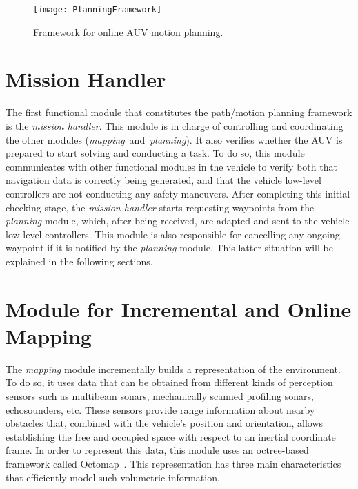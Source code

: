 \begin{figure}[htbp]
	\centering
	\texttt{[image: PlanningFramework]} \quad
\caption[Framework for online AUV motion planning.]
{Framework for online AUV motion planning.}
\label{fig:ModulesPlannFramework}
\end{figure}

\section{Mission Handler}

The first functional module that constitutes the path/motion planning framework
is the \textit{mission handler}. This module is in charge of controlling and
coordinating the other modules \mbox{(\textit{mapping} and \textit{planning})}.
It also verifies whether the \ac{AUV} is prepared to start solving and
conducting a task. To do so, this module communicates with other functional
modules in the vehicle to verify both that navigation data is correctly being
generated, and that the vehicle low-level controllers are not conducting any
safety maneuvers. After completing this initial checking stage, the
\textit{mission handler} starts requesting waypoints from the \textit{planning}
module, which, after being received, are adapted and sent to the vehicle
low-level controllers. This module is also responsible for cancelling any
ongoing waypoint if it is notified by the \textit{planning} module. This latter
situation will be explained in the following sections.

\section{Module for Incremental and Online Mapping}
\label{sec:MappingModule}

The \textit{mapping} module incrementally builds a representation of the
environment. To do so, it uses data that can be obtained from different kinds of
perception sensors such as multibeam sonars, mechanically scanned profiling
sonars, echosounders, etc. These sensors provide range information about nearby
obstacles that, combined with the vehicle's position and orientation, allows
establishing the free and occupied space with respect to an inertial coordinate
frame. In order to represent this data, this module uses an octree-based
framework called Octomap~\cite{Hornung2013}. This representation has three main
characteristics that efficiently model such volumetric information.

